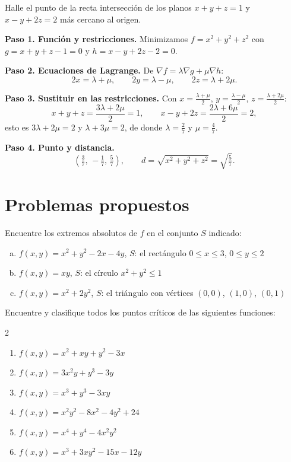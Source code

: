 \begin{example}
Halle el punto de la recta intersección de los planos $x+y+z=1$ y
$x-y+2z=2$ más cercano al origen.
\begin{myproof}
\textbf{Paso 1. Función y restricciones.}
Minimizamos $f=x^2+y^2+z^2$ con $g=x+y+z-1=0$ y $h=x-y+2z-2=0$.

\textbf{Paso 2. Ecuaciones de Lagrange.}
De $\nabla f=\lambda\nabla g+\mu\nabla h$:
\[
  2x=\lambda+\mu,\qquad 2y=\lambda-\mu,\qquad 2z=\lambda+2\mu.
\]

\textbf{Paso 3. Sustituir en las restricciones.}
Con $x=\tfrac{\lambda+\mu}{2}$, $y=\tfrac{\lambda-\mu}{2}$,
$z=\tfrac{\lambda+2\mu}{2}$:
\[
  x+y+z=\frac{3\lambda+2\mu}{2}=1,\qquad
  x-y+2z=\frac{2\lambda+6\mu}{2}=2,
\]
esto es $3\lambda+2\mu=2$ y $\lambda+3\mu=2$, de donde $\lambda=\tfrac27$ y
$\mu=\tfrac47$.

\textbf{Paso 4. Punto y distancia.}
\[
  \boxed{\ \left(\tfrac37,\,-\tfrac17,\,\tfrac57\right),\qquad
  d=\sqrt{x^2+y^2+z^2}=\sqrt{\tfrac57}.\ }
\]
\end{myproof}
\end{example}

\section{Problemas propuestos}

\begin{prob}
Encuentre los extremos absolutos de $f$ en el conjunto $S$ indicado:
\begin{enumerate}[a)]
    \item $f(x,y) = x^2 + y^2 - 2x - 4y$, $S$: el rectángulo
    $0\leq x\leq 3$, $0\leq y\leq 2$
    \item $f(x,y) = xy$, $S$: el círculo $x^2 + y^2 \leq 1$
    \item $f(x,y) = x^2 + 2y^2$, $S$: el triángulo con vértices
    $(0,0)$, $(1,0)$, $(0,1)$
\end{enumerate}
\end{prob}

\begin{prob}
Encuentre y clasifique todos los puntos críticos de las siguientes
funciones:
\begin{multicols}{2}
\begin{enumerate}
    \item $f(x,y) = x^2 + xy + y^2 - 3x$
    \item $f(x,y) = 3x^2 y + y^3 - 3y$
    \item $f(x,y) = x^3 + y^3 - 3xy$
    \item $f(x,y) = x^2 y^2 - 8x^2 - 4y^2 + 24$
    \item $f(x,y) = x^4 + y^4 - 4x^2 y^2$
    \item $f(x,y) = x^3 + 3xy^2 - 15x - 12y$
\end{enumerate}
\end{multicols}
\end{prob}



